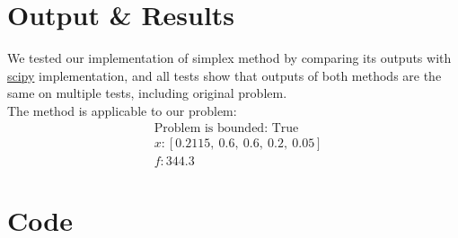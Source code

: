 \documentclass{article}
\begin{document}
\section{Output \& Results}
We tested our implementation of simplex method by comparing its outputs with \href{https://scipy.org}{scipy} implementation, and all tests show that outputs of both methods are the same on multiple tests, including original problem. \\
The method is applicable to our problem:
\begin{align*}
&\text{Problem is bounded: True} \\
&x: [0.2115, \ 0.6, \ 0.6, \ 0.2, \ 0.05] \\
&f: 344.3
\end{align*}

\section{Code}
\end{document}
